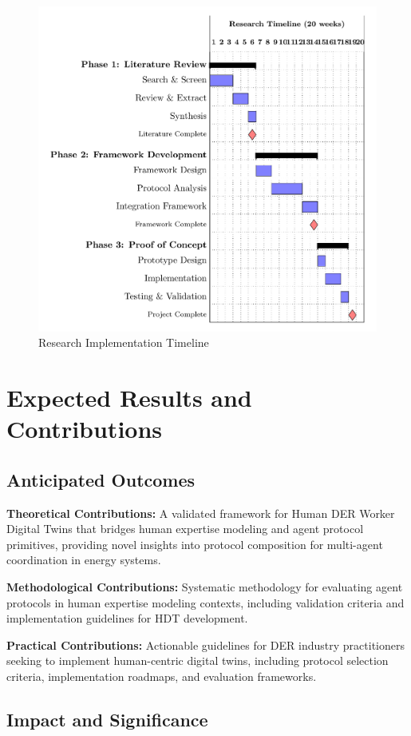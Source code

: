 \documentclass[12pt,a4paper]{article}
\begin{document}
\begin{figure}[h!]
    \centering
    \includegraphics[width=.8\linewidth]{timeline-gantt-simple-1.png}
    \caption{Research Implementation Timeline}
    \label{fig:timeline}
\end{figure}

\section{Expected Results and Contributions}
\label{sec:results}

\subsection{Anticipated Outcomes}

\textbf{Theoretical Contributions:} A validated framework for Human DER Worker Digital Twins that bridges human expertise modeling and agent protocol primitives, providing novel insights into protocol composition for multi-agent coordination in energy systems.

\textbf{Methodological Contributions:} Systematic methodology for evaluating agent protocols in human expertise modeling contexts, including validation criteria and implementation guidelines for HDT development.

\textbf{Practical Contributions:} Actionable guidelines for DER industry practitioners seeking to implement human-centric digital twins, including protocol selection criteria, implementation roadmaps, and evaluation frameworks.

\subsection{Impact and Significance}
\end{document}
